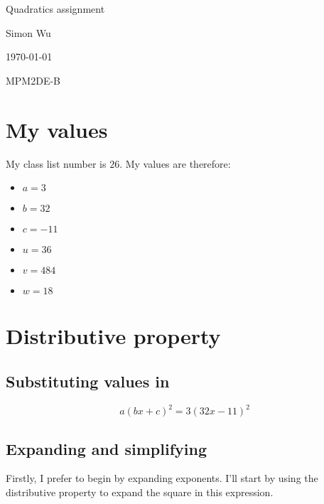 \documentclass[12pt]{article}
\author{Simon Wu}
\date{March 2021}
\begin{document}
\begin{titlepage}

\begin{center}
    \Huge{Quadratics assignment}
    
    \vspace{1in}
    
    \Large{Simon Wu}
    
    \Large{\today}
    
    \vspace{1in}
    
    \Large{MPM2DE-B}
    
\end{center}

\tableofcontents

\end{titlepage}

\section{My values}

My class list number is $26$. My values are therefore:

\begin{itemize}

\item $a=3$
\item $b=32$
\item $c=-11$
\item $u=36$
\item $v=484$
\item $w=18$

\end{itemize}

\section{Distributive property}

\subsection{Substituting values in}

\[
a(bx+c)^2 = 3(32x-11)^2
\]

\subsection{Expanding and simplifying}

Firstly, I prefer to begin by expanding exponents.
I'll start by using the distributive property to expand the square in this expression.
\end{document}
